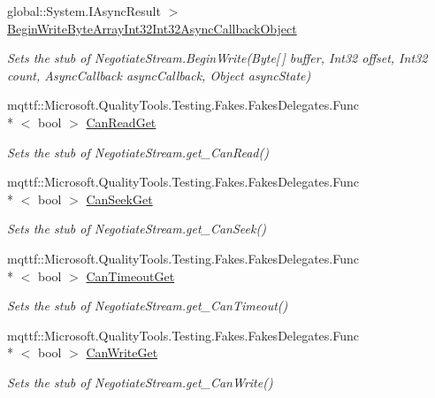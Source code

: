 \begin{DoxyCompactItemize}
global\-::\-System.\-I\-Async\-Result $>$ \hyperlink{class_system_1_1_net_1_1_security_1_1_fakes_1_1_stub_negotiate_stream_a3238f8207d6ca029c1700f0e0894dd2c}{Begin\-Write\-Byte\-Array\-Int32\-Int32\-Async\-Callback\-Object}
\begin{DoxyCompactList}\small\item\em Sets the stub of Negotiate\-Stream.\-Begin\-Write(\-Byte\mbox{[}$\,$\mbox{]} buffer, Int32 offset, Int32 count, Async\-Callback async\-Callback, Object async\-State)\end{DoxyCompactList}\item 
mqttf\-::\-Microsoft.\-Quality\-Tools.\-Testing.\-Fakes.\-Fakes\-Delegates.\-Func\\*
$<$ bool $>$ \hyperlink{class_system_1_1_net_1_1_security_1_1_fakes_1_1_stub_negotiate_stream_a75ca9e085dcb7e7c01b4e75602148e4f}{Can\-Read\-Get}
\begin{DoxyCompactList}\small\item\em Sets the stub of Negotiate\-Stream.\-get\-\_\-\-Can\-Read()\end{DoxyCompactList}\item 
mqttf\-::\-Microsoft.\-Quality\-Tools.\-Testing.\-Fakes.\-Fakes\-Delegates.\-Func\\*
$<$ bool $>$ \hyperlink{class_system_1_1_net_1_1_security_1_1_fakes_1_1_stub_negotiate_stream_a97b555c72009dcdaec1a2043b573210c}{Can\-Seek\-Get}
\begin{DoxyCompactList}\small\item\em Sets the stub of Negotiate\-Stream.\-get\-\_\-\-Can\-Seek()\end{DoxyCompactList}\item 
mqttf\-::\-Microsoft.\-Quality\-Tools.\-Testing.\-Fakes.\-Fakes\-Delegates.\-Func\\*
$<$ bool $>$ \hyperlink{class_system_1_1_net_1_1_security_1_1_fakes_1_1_stub_negotiate_stream_abb4afbe631a24fdbf14d161efab2a4a9}{Can\-Timeout\-Get}
\begin{DoxyCompactList}\small\item\em Sets the stub of Negotiate\-Stream.\-get\-\_\-\-Can\-Timeout()\end{DoxyCompactList}\item 
mqttf\-::\-Microsoft.\-Quality\-Tools.\-Testing.\-Fakes.\-Fakes\-Delegates.\-Func\\*
$<$ bool $>$ \hyperlink{class_system_1_1_net_1_1_security_1_1_fakes_1_1_stub_negotiate_stream_ae9991b8c7a9ee8bbdae8dacba9f4882c}{Can\-Write\-Get}
\begin{DoxyCompactList}\small\item\em Sets the stub of Negotiate\-Stream.\-get\-\_\-\-Can\-Write()\end{DoxyCompactList}\item 

\end{DoxyCompactItemize}
